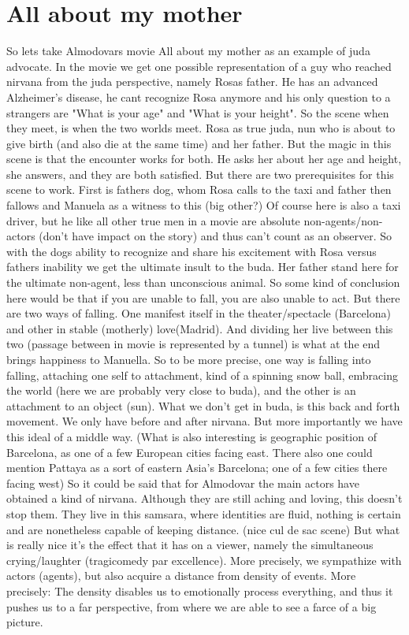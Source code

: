 \documentclass[10pt]{book}
\begin{document}
\section{All about my mother}
So lets take Almodovars movie All about my mother as an example of juda advocate. In the movie we get one possible representation of a guy who reached nirvana from the juda perspective, namely Rosas father. He has an advanced Alzheimer's disease, he cant recognize Rosa anymore and his only question to a strangers are "What is your age" and "What is your height". So the scene when they meet, is when the two worlds meet. Rosa as true juda, nun who is about to give birth (and also die at the same time) and her father. But the magic in this scene is that the encounter works for both. He asks her about her age and height, she answers, and they are both satisfied. But there are two prerequisites for this scene to work. First is fathers dog, whom Rosa calls to the taxi and father then fallows and Manuela as a witness to this (big other?) Of course here is also a taxi driver, but he like all other true men in a movie are absolute non-agents/non-actors (don't have impact on the story) and thus can't count as an observer. So with the dogs ability to recognize and share his excitement with Rosa versus fathers inability we get the ultimate insult to the buda. Her father stand here for the ultimate non-agent, less than unconscious animal. 
So some kind of conclusion here would be that if you are unable to fall, you are also unable to act. But there are two ways of falling. One manifest itself in the theater/spectacle (Barcelona) and other in stable (motherly) love(Madrid). And dividing her live between this two (passage between in movie is represented by a tunnel) is what at the end brings happiness to Manuella. So to be more precise, one way is falling into falling, attaching one self to attachment, kind of a spinning snow ball, embracing the world (here we are probably very close to buda), and the other is an attachment to an object (sun). What we don't get in buda, is this back and forth movement. We only have before and after nirvana. But more importantly we have this ideal of a middle way. (What is also interesting is geographic position of Barcelona, as one of a few European cities facing east. There also one could mention Pattaya as a sort of eastern Asia's Barcelona; one of a few cities there facing west)
So it could be said that for Almodovar the main actors have obtained a kind of nirvana. Although they are still aching and loving, this doesn't stop them. They live in this samsara, where identities are fluid, nothing is certain and are nonetheless capable of keeping distance. (nice cul de sac scene) But what is really nice it's the effect that it has on a viewer, namely the simultaneous crying/laughter (tragicomedy par excellence). More precisely, we sympathize with actors (agents), but also acquire a distance from density of events. More precisely: The density disables us to emotionally process everything, and thus it pushes us to a far perspective, from where we are able to see a farce of a big picture.
\end{document}
